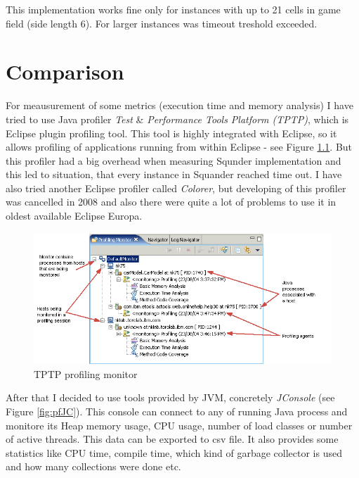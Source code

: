 \documentclass[11pt,twoside,a4paper]{book}
\begin{document}
This implementation works fine only for instances with up to 21 cells in game
field (side length 6). For larger instances was timeout treshold exceeded.
\newpage



\chapter{Comparison}
\label{ch:comparison}
For meausurement of some metrics (execution time and memory analysis) I have
tried to use Java profiler \textit{Test} \& \textit{Performance Tools Platform
(TPTP)}, which is Eclipse plugin profiling tool. This tool is highly integrated with Eclipse, so
it allows profiling of applications running from within Eclipse - see Figure
\ref{fig:pfMonitor}. But this profiler had a big overhead when measuring Squnder
implementation and this led to situation, that every instance in Squander
reached time out. I have also tried another Eclipse profiler called
\textit{Colorer}, but developing of this profiler was cancelled in 2008 and also
there were quite a lot of problems to use it in oldest available Eclipse Europa.


\begin{figure}[ht]
\begin{center}
\includegraphics[width=14cm]{figures/pf}
\caption{TPTP profiling monitor}
\label{fig:pfMonitor}
\end{center}
\end{figure}

After that I decided to use tools provided by JVM, concretely \textit{JConsole}
(see Figure \ref{fig:pfJC}). This console can connect to any of running Java
process and monitore its Heap memory usage, CPU usage, number of load classes or
number of active threads. This data can be exported to csv file. It also
provides some statistics like CPU time, compile time, which kind of garbage
collector is used and how many collections were done etc.
\end{document}
